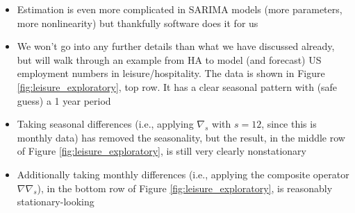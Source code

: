 \documentclass{article}
\begin{document}
\begin{itemize}
\item Estimation is even more complicated in SARIMA models (more parameters, 
  more nonlinearity) but thankfully software does it for us

\item We won't go into any further details than what we have discussed already,
  but will walk through an example from HA to model (and forecast) US
  employment numbers in leisure/hospitality. The data is shown in Figure
  \ref{fig:leisure_exploratory}, top row. It has a clear seasonal pattern with
  (safe guess) a 1 year period  

\item Taking seasonal differences (i.e., applying $\nabla_s$ with $s = 12$,
  since this is monthly data) has removed the seasonality, but the result, in
  the middle row of Figure \ref{fig:leisure_exploratory}, is still very clearly
  nonstationary   

\item Additionally taking monthly differences (i.e., applying the composite 
  operator $\nabla \nabla_s$), in the bottom row of Figure
  \ref{fig:leisure_exploratory}, is reasonably stationary-looking    


\end{itemize}
\end{document}
